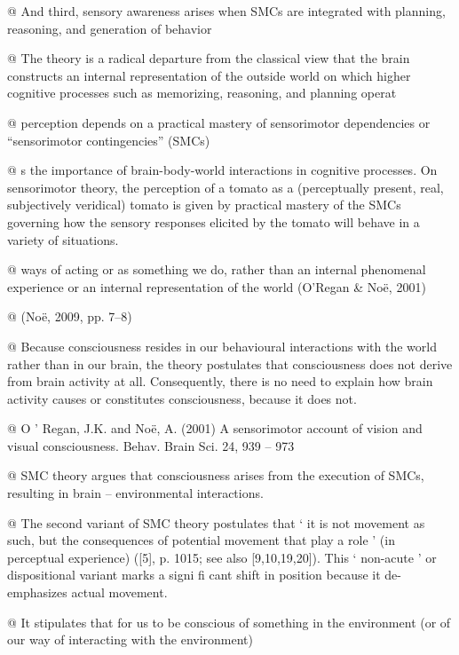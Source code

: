 \documentclass[utf8]{article}
\begin{document}
\begin{WritingMaterials}
			@ And third, sensory awareness arises when SMCs are integrated with planning, reasoning, and generation of behavior

			@ The theory is a radical departure from the classical view that the brain constructs an internal representation of the outside world on which higher cognitive processes such as memorizing, reasoning, and planning operat

			@ perception depends on a practical mastery of sensorimotor dependencies or “sensorimotor contingencies” (SMCs)

			@ s the importance of brain-body-world interactions in cognitive processes. On sensorimotor theory, the perception of a tomato as a (perceptually present, real, subjectively veridical) tomato is given by practical mastery of the SMCs governing how the sensory responses elicited by the tomato will behave in a variety of situations.

			@ ways of acting or as something we do, rather than an internal phenomenal experience or an internal representation of the world (O’Regan \& Noë, 2001)

			@  (Noë, 2009, pp. 7–8)

			@ Because consciousness resides in our behavioural interactions with the world rather than in our brain, the theory postulates that consciousness does not derive from brain activity at all. Consequently, there is no need to explain how brain activity causes or constitutes consciousness, because it does not.

			@ O ’ Regan, J.K. and Noë, A. (2001) A sensorimotor account of vision and visual consciousness. Behav. Brain Sci. 24, 939 – 973

			@ SMC theory argues that consciousness arises from the execution of SMCs, resulting in brain – environmental interactions.

			@ The second variant of SMC theory postulates that ‘ it is not movement as such, but the consequences of potential movement that play a role ’ (in perceptual experience) ([5], p. 1015; see also [9,10,19,20]). This ‘ non-acute ’ or dispositional variant marks a signi fi cant shift in position because it de-emphasizes actual movement. \cite{pennartz2017consciousness}

			@ It stipulates that for us to be conscious of something in the environment (or of our way of interacting with the environment)

		\end{WritingMaterials}
\end{document}
